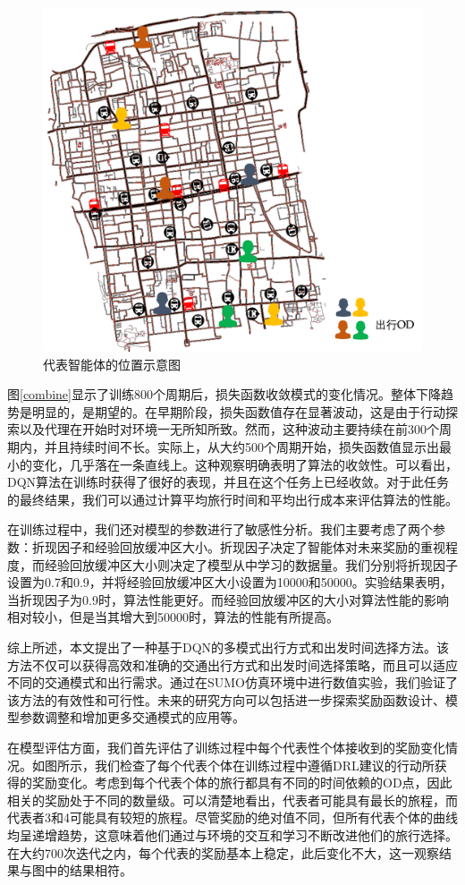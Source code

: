 \begin{figure}[H]
  \centering
  \includegraphics[width=.75\linewidth]{figures/content/agent_map.png}
  \caption{代表智能体的位置示意图}
  \label{agent_map}
\end{figure}



图\ref{combine}显示了训练800个周期后，损失函数收敛模式的变化情况。整体下降趋势是明显的，是期望的。在早期阶段，损失函数值存在显著波动，这是由于行动探索以及代理在开始时对环境一无所知所致。然而，这种波动主要持续在前300个周期内，并且持续时间不长。实际上，从大约500个周期开始，损失函数值显示出最小的变化，几乎落在一条直线上。这种观察明确表明了算法的收敛性。可以看出，DQN算法在训练时获得了很好的表现，并且在这个任务上已经收敛。对于此任务的最终结果，我们可以通过计算平均旅行时间和平均出行成本来评估算法的性能。

在训练过程中，我们还对模型的参数进行了敏感性分析。我们主要考虑了两个参数：折现因子和经验回放缓冲区大小。折现因子决定了智能体对未来奖励的重视程度，而经验回放缓冲区大小则决定了模型从中学习的数据量。我们分别将折现因子设置为0.7和0.9，并将经验回放缓冲区大小设置为10000和50000。实验结果表明，当折现因子为0.9时，算法性能更好。而经验回放缓冲区的大小对算法性能的影响相对较小，但是当其增大到50000时，算法的性能有所提高。

综上所述，本文提出了一种基于DQN的多模式出行方式和出发时间选择方法。该方法不仅可以获得高效和准确的交通出行方式和出发时间选择策略，而且可以适应不同的交通模式和出行需求。通过在SUMO仿真环境中进行数值实验，我们验证了该方法的有效性和可行性。未来的研究方向可以包括进一步探索奖励函数设计、模型参数调整和增加更多交通模式的应用等。

在模型评估方面，我们首先评估了训练过程中每个代表性个体接收到的奖励变化情况。如图所示，我们检查了每个代表个体在训练过程中遵循DRL建议的行动所获得的奖励变化。考虑到每个代表个体的旅行都具有不同的时间依赖的OD点，因此相关的奖励处于不同的数量级。可以清楚地看出，代表者可能具有最长的旅程，而代表者3和4可能具有较短的旅程。尽管奖励的绝对值不同，但所有代表个体的曲线均呈递增趋势，这意味着他们通过与环境的交互和学习不断改进他们的旅行选择。在大约700次迭代之内，每个代表的奖励基本上稳定，此后变化不大，这一观察结果与图中的结果相符。

